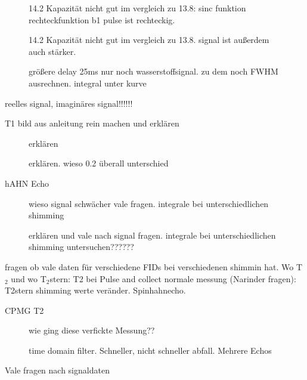 \begin{figure}[ht]
    \centering
    
    \caption[]{14.2 Kapazität nicht gut im vergleich zu 13.8: sinc funktion rechteckfunktion b1 pulse ist rechteckig.}
    \label{fig:Pulsandcollect142}
\end{figure}
\begin{figure}[ht]
    \centering
    
    \caption[]{14.2 Kapazität nicht gut im vergleich zu 13.8. signal ist außerdem auch stärker.}
    \label{fig:Pulsandcollect142}
\end{figure}


\begin{figure}[ht]
    \centering
    
    \caption[]{größere delay 25ms nur noch wasserstoffsignal. zu dem noch FWHM ausrechnen. integral unter kurve}
    \label{fig:Pulsandcollect142}
\end{figure}
reelles signal, imaginäres signal!!!!!!


T1
bild aus anleitung rein machen und erklären
\begin{figure}[ht]
    \centering
    
    \caption[]{erklären}
    \label{fig:Pulsandcollect142}
\end{figure}

\begin{figure}[ht]
    \centering
    
    \caption[]{erklären. wieso 0.2 überall unterschied}
    \label{fig:Pulsandcollect142}
\end{figure}

hAHN Echo
\begin{figure}[ht]
    \centering
    
    \caption[]{wieso signal schwächer vale fragen. integrale bei unterschiedlichen shimming}
    \label{fig:Pulsandcollect142}
\end{figure}
\begin{figure}[ht]
    \centering
    
    \caption[]{erklären und vale nach signal fragen. integrale bei unterschiedlichen shimming untersuchen??????}
    \label{fig:Pulsandcollect142}
\end{figure}
fragen ob vale daten für verschiedene FIDs bei verschiedenen shimmin hat.
Wo T$_2$ und wo T$_2$stern: T2 bei Pulse and collect normale messung (Narinder fragen): T2stern shimming werte veränder. Spinhahnecho.



CPMG T2

\begin{figure}[ht]
    \centering
    
    \caption[]{wie ging diese verfickte Messung??}
    \label{fig:Pulsandcollect142}
\end{figure}

\begin{figure}[ht]
    \centering
    
    \caption[]{time domain filter. Schneller, nicht schneller abfall. Mehrere Echos}
    \label{fig:Pulsandcollect142}
\end{figure}
Vale fragen nach signaldaten